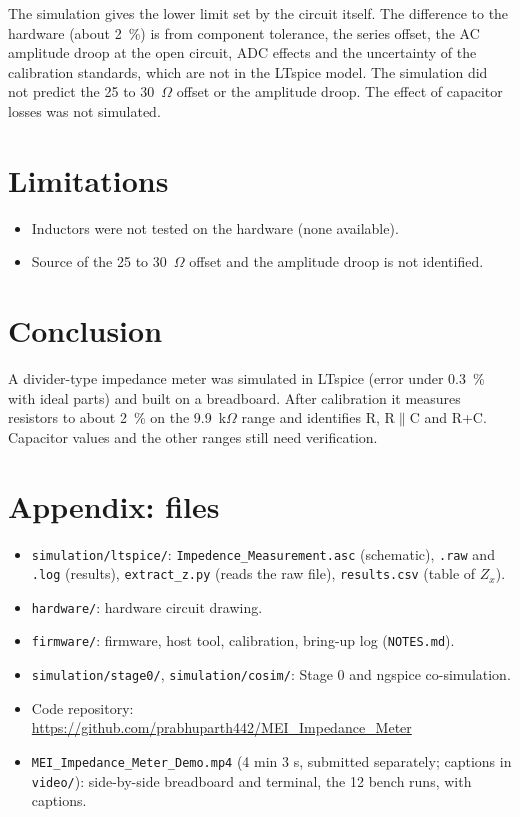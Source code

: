 \documentclass[11pt,a4paper]{article}
\newcommand{\Zx}{Z_x}
\begin{document}
The simulation gives the lower limit set by the circuit itself. The difference to the hardware (about 2~\%) is from component tolerance, the series offset, the AC amplitude droop at the open circuit, ADC effects and the uncertainty of the calibration standards, which are not in the LTspice model. The simulation did not predict the 25 to 30~$\Omega$ offset or the amplitude droop. The effect of capacitor losses was not simulated.

\section{Limitations}
\begin{itemize}
  \item Inductors were not tested on the hardware (none available).
  \item Source of the 25 to 30~$\Omega$ offset and the amplitude droop is not identified.
\end{itemize}

\section{Conclusion}
A divider-type impedance meter was simulated in LTspice (error under 0.3~\% with ideal parts) and built on a breadboard. After calibration it measures resistors to about 2~\% on the 9.9~k$\Omega$ range and identifies R, R$\|$C and R+C. Capacitor values and the other ranges still need verification.

\appendix
\section*{Appendix: files}
\begin{itemize}
  \item \texttt{simulation/ltspice/}: \texttt{Impedence\_Measurement.asc} (schematic), \texttt{.raw} and \texttt{.log} (results), \texttt{extract\_z.py} (reads the raw file), \texttt{results.csv} (table of $\Zx$).
  \item \texttt{hardware/}: hardware circuit drawing.
  \item \texttt{firmware/}: firmware, host tool, calibration, bring-up log (\texttt{NOTES.md}).
  \item \texttt{simulation/stage0/}, \texttt{simulation/cosim/}: Stage 0 and ngspice co-simulation.
  \item Code repository: \url{https://github.com/prabhuparth442/MEI_Impedance_Meter}
  \item \texttt{MEI\_Impedance\_Meter\_Demo.mp4} (4 min 3 s, submitted separately; captions in \texttt{video/}): side-by-side breadboard and terminal, the 12 bench runs, with captions.
\end{itemize}
\end{document}
